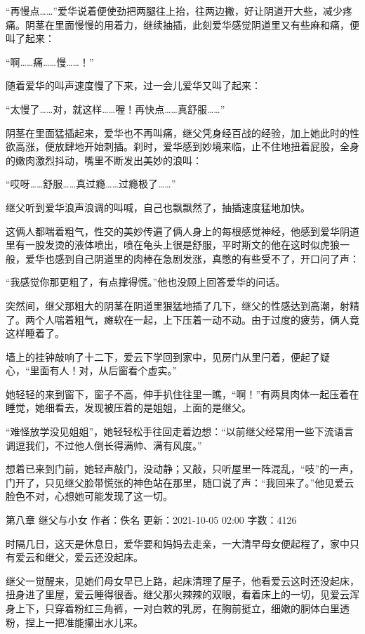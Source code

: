\documentclass[12pt,UTF8]{ctexbook}
\begin{document}
“再慢点……”爱华说着便使劲把两腿往上抬，往两边撇，好让阴道开大些，减少疼痛。阴茎在里面慢慢的用着力，继续抽插，此刻爱华感觉阴道里又有些麻和痛，便叫了起来：

“啊……痛……慢……！”

随着爱华的叫声速度慢了下来，过一会儿爱华又叫了起来：

“太慢了……对，就这样……喔！再快点……真舒服……”

阴茎在里面猛插起来，爱华也不再叫痛，继父凭身经百战的经验，加上她此时的性欲高涨，便放肆地开始刺插。刹时，爱华感到妙境来临，止不住地扭着屁股，全身的嫩肉激烈抖动，嘴里不断发出美妙的浪叫：

“哎呀……舒服……真过瘾……过瘾极了……”

继父听到爱华浪声浪调的叫喊，自己也飘飘然了，抽插速度猛地加快。

这俩人都喘着粗气，性交的美妙传遍了俩人身上的每根感觉神经，他感到爱华阴道里有一股发烫的液体喷出，喷在龟头上很是舒服，平时斯文的他在这时似虎狼一般，爱华也感到自己阴道里的肉棒在急剧发涨，真憋的有些受不了，开口问了声：

“我感觉你那更粗了，有点撑得慌。”他也没顾上回答爱华的问话。

突然间，继父那粗大的阴茎在阴道里狠猛地插了几下，继父的性感达到高潮，射精了。两个人喘着粗气，瘫软在一起，上下压着一动不动。由于过度的疲劳，俩人竟这样睡着了。

墙上的挂钟敲响了十二下，爱云下学回到家中，见房门从里闩着，便起了疑心，“里面有人！对，从后窗看个虚实。”

她轻轻的来到窗下，窗子不高，伸手扒住往里一瞧，“啊！”有两具肉体一起压着在睡觉，她细看去，发现被压着的是姐姐，上面的是继父。

“难怪放学没见姐姐”，她轻轻松手往回走着边想：“以前继父经常用一些下流语言调逗我们，不过他人倒长得满帅、满有风度。”

想着已来到门前，她轻声敲门，没动静；又敲，只听屋里一阵混乱，“吱”的一声，门开了，只见继父脸带慌张的神色站在那里，随口说了声：“我回来了。”他见爱云脸色不对，心想她可能发现了这一切。

第八章 继父与小女
作者：佚名      更新：2021-10-05 02:00      字数：4126

时隔几日，这天是休息日，爱华要和妈妈去走亲，一大清早母女便起程了，家中只有爱云和继父，爱云还没起床。

继父一觉醒来，见她们母女早已上路，起床清理了屋子，他看爱云这时还没起床，扭身进了里屋，爱云睡得很香。继父那火辣辣的双眼，看着床上的一切，见爱云浑身上下，只穿着粉红三角裤，一对白敕的乳房，在胸前挺立，细嫩的胴体白里透粉，捏上一把准能攥出水儿来。
\end{document}
